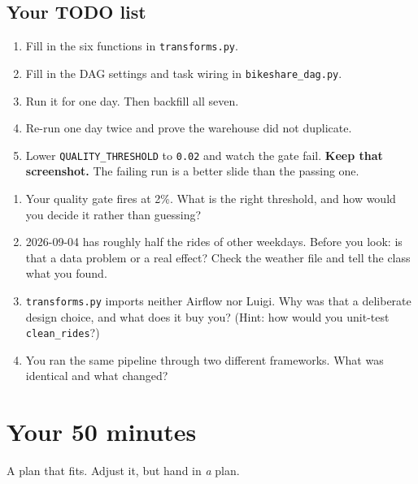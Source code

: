 \documentclass[11pt]{article}
\newcommand{\key}[1]{\textcolor{accent}{\textbf{#1}}}
\begin{document}
\subsection{Your TODO list}

\begin{enumerate}
  \item Fill in the six functions in \texttt{transforms.py}.
  \item Fill in the DAG settings and task wiring in \texttt{bikeshare\_dag.py}.
  \item Run it for one day. Then backfill all seven.
  \item Re-run one day twice and prove the warehouse did not duplicate.
  \item Lower \texttt{QUALITY\_THRESHOLD} to \texttt{0.02} and watch the gate
        fail. \key{Keep that screenshot.} The failing run is a better slide
        than the passing one.
\end{enumerate}

\begin{qbox}
\begin{enumerate}
  \item Your quality gate fires at 2\%. What is the right threshold, and how
        would you decide it rather than guessing?
  \item 2026-09-04 has roughly half the rides of other weekdays. Before you
        look: is that a data problem or a real effect? Check the weather file
        and tell the class what you found.
  \item \texttt{transforms.py} imports neither Airflow nor Luigi. Why was that
        a deliberate design choice, and what does it buy you? (Hint: how would
        you unit-test \texttt{clean\_rides}?)
  \item You ran the same pipeline through two different frameworks. What was
        identical and what changed?
\end{enumerate}
\end{qbox}

\section{Your 50 minutes}

A plan that fits. Adjust it, but hand in \emph{a} plan.
\end{document}
